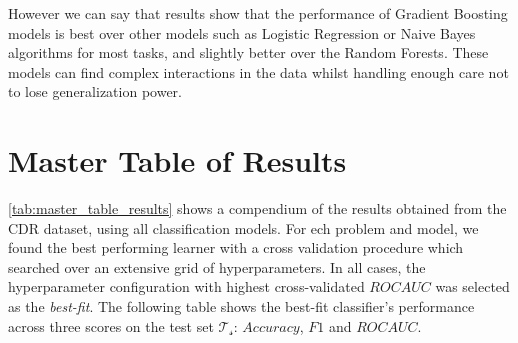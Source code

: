 However we can say that results show that the performance of Gradient Boosting models is best over other models such as Logistic Regression or Naive Bayes algorithms for most tasks, and slightly better over the Random Forests.
These models can find complex interactions in the data whilst handling enough care not to lose generalization power.




\section{Master Table of Results}\label{sec:master_table}

\cref{tab:master_table_results} shows a compendium of the results obtained from the CDR dataset, using all classification models.
For ech problem and model, we found the best performing learner with a cross validation procedure which searched over an extensive grid of hyperparameters.
In all cases, the hyperparameter configuration with highest cross-validated $ROC AUC$ was selected as the \textit{best-fit}.
The following table shows the best-fit classifier's performance across three scores on the test set $\mathcal{T_s}$: $Accuracy$, $F1$ and $ROC AUC$.



